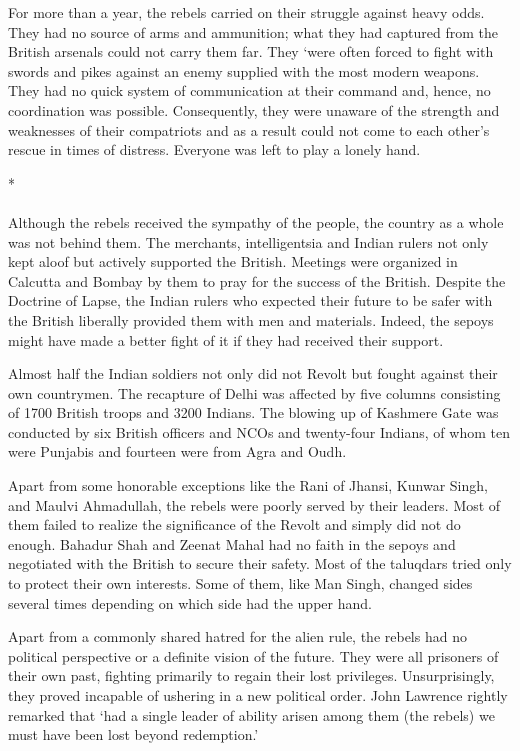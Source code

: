 \begin{multicols}{2}
For more than a year, the rebels carried on their struggle against heavy odds. They had no source of arms and ammunition; what they had captured from the British arsenals could not carry them far. They `were often forced to fight with swords and pikes against an enemy supplied with the most modern weapons. They had no quick system of communication at their command and, hence, no coordination was possible. Consequently, they were unaware of the strength and weaknesses of their compatriots and as a result could not come to each other's rescue in times of distress. Everyone was left to play a lonely hand.

\begin{center}*\end{center}

\paragraph*{}
Although the rebels received the sympathy of the people, the country as a whole was not behind them. The merchants, intelligentsia and Indian rulers not only kept aloof but actively supported the British. Meetings were organized in Calcutta and Bombay by them to pray for the success of the British. Despite the Doctrine of Lapse, the Indian rulers who expected their future to be safer with the British liberally provided them with men and materials. Indeed, the sepoys might have made a better fight of it if they had received their support.

Almost half the Indian soldiers not only did not Revolt but fought against their own countrymen. The recapture of Delhi was affected by five columns consisting of 1700 British troops and 3200 Indians. The blowing up of Kashmere Gate was conducted by six British officers and NCOs and twenty-four Indians, of whom ten were Punjabis and fourteen were from Agra and Oudh.

Apart from some honorable exceptions like the Rani of Jhansi, Kunwar Singh, and Maulvi Ahmadullah, the rebels were poorly served by their leaders. Most of them failed to realize the significance of the Revolt and simply did not do enough. Bahadur Shah and Zeenat Mahal had no faith in the sepoys and negotiated with the British to secure their safety. Most of the taluqdars tried only to protect their own interests. Some of them, like Man Singh, changed sides several times depending on which side had the upper hand.

Apart from a commonly shared hatred for the alien rule, the rebels had no political perspective or a definite vision of the future. They were all prisoners of their own past, fighting primarily to regain their lost privileges. Unsurprisingly, they proved incapable of ushering in a new political order. John Lawrence rightly remarked that `had a single leader of ability arisen among them (the rebels) we must have been lost beyond redemption.'


\end{multicols}
